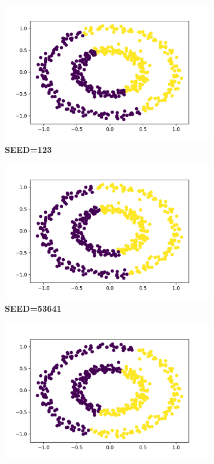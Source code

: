 \documentclass[11pt]{article}
\begin{document}
\begin{figure}[H]
    \begin{subfigure}{0.33\linewidth}
        \centering
        \includegraphics[width=1\linewidth]{d3_123.png}
        \caption{\textbf{SEED=123}}
    \end{subfigure}%
    \begin{subfigure}{0.33\linewidth}
        \centering
        \includegraphics[width=1\linewidth]{d3_53641.png}
        \caption{\textbf{SEED=53641}}
    \end{subfigure}%
    \begin{subfigure}{0.33\linewidth}
        \centering
        \includegraphics[width=1\linewidth]{d3_87234.png}

\end{subfigure}
\end{figure}
\end{document}
